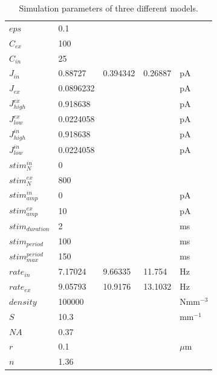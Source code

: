 \documentclass[11pt]{article}
\begin{document}
\begin{table}
\begin{tabular}{lllll}
$eps$                 &        0.1 &        &         &             \\
$C_{ex}$              &        100 &         &         &             \\
$C_{in}$              &         25 &          &          &             \\
$J_{in}$              &    0.88727 &   0.394342 &    0.26887 &          pA \\
$J_{ex}$              &  0.0896232 &   &   &          pA \\
$J_{high}^{ex}$       &   0.918638 &    &    &          pA \\
$J_{low}^{ex}$        &  0.0224058 &   &   &          pA \\
$J_{high}^{in}$       &   0.918638 &    &   &          pA \\
$J_{low}^{in}$        &  0.0224058 &   &   &          pA \\
$stim_{N}^{in}$       &          0 &           &           &             \\
$stim_{N}^{ex}$       &        800 &         &         &             \\
$stim_{amp}^{in}$     &          0 &           &           &          pA \\
$stim_{amp}^{ex}$     &         10 &          &          &          pA \\
$stim_{duration}$     &          2 &           &           &          ms \\
$stim_{period}$       &        100 &         &         &          ms \\
$stim_{max}^{period}$ &        150 &         &         &          ms \\
$rate_{in}$           &    7.17024 &    9.66335 &     11.754 &          Hz \\
$rate_{ex}$           &    9.05793 &    10.9176 &    13.1032 &          Hz \\
$density$             &     100000 &      &      &  Nmm$^{-3}$ \\
$S$                   &       10.3 &       &      &   mm$^{-1}$ \\
$NA$                  &       0.37 &       &       &             \\
$r$                   &        0.1 &         &         &      $\mu$m \\
$n$                   &       1.36 &        &        &             \\
\bottomrule
\end{tabular}
\caption{\label{tab:params} Simulation parameters of three different models.}
\end{table}
\end{document}
